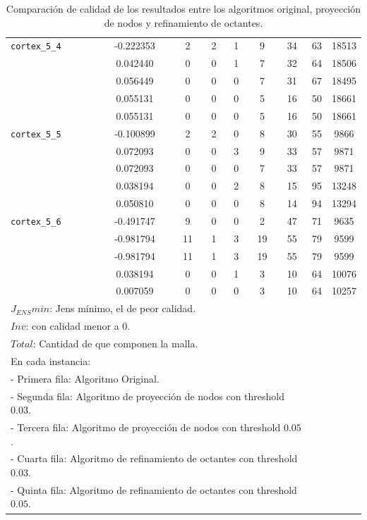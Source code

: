 \begin{table}[H]
\begin{tabular}{lc cc cc cc c}
		\hline
		\texttt{cortex\_5\_4} & -0.222353 & 2 & 2 & 1 & 9 & 34 & 63 & 18513 \\
		& 0.042440 & 0 & 0 & 1 & 7 & 32 & 64 & 18506 \\
		& 0.056449 & 0 & 0 & 0 & 7 & 31 & 67 & 18495 \\
		& 0.055131 & 0 & 0 & 0 & 5 & 16 & 50 & 18661 \\
		& 0.055131 & 0 & 0 & 0 & 5 & 16 & 50 & 18661 \\
		\hline
		\texttt{cortex\_5\_5} & -0.100899 & 2 & 2 & 0 & 8 & 30 & 55 & 9866 \\
		& 0.072093 & 0 & 0 & 3 & 9 & 33 & 57 & 9871 \\
		& 0.072093 & 0 & 0 & 0 & 7 & 33 & 57 & 9871 \\
		& 0.038194 & 0 & 0 & 2 & 8 & 15 & 95 & 13248 \\
		& 0.050810 & 0 & 0 & 0 & 8 & 14 & 94 & 13294 \\
 		\hline
		\texttt{cortex\_5\_6} & -0.491747 & 9 & 0 & 0 & 2 & 47 & 71 & 9635 \\
		& -0.981794 & 11 & 1 & 3 & 19 & 55 & 79 & 9599 \\
		& -0.981794 & 11 & 1 & 3 & 19 & 55 & 79 & 9599 \\
		& 0.038194 & 0 & 0 & 1 & 3 & 10 & 64 & 10076 \\
		& 0.007059 & 0 & 0 & 0 & 3 & 10 & 64 & 10257 \\
		\hline
		\multicolumn{7}{l}{ $J_{ENS}min$: Jens mínimo, el \element{} de peor calidad.} \\
		\multicolumn{7}{l}{ $Inv$: \elements{} con calidad menor a $0$.} \\
		\multicolumn{7}{l}{ $Total$: Cantidad de \elements{} que componen la malla.} \\
		\multicolumn{7}{l}{ En cada instancia: }\\
		\multicolumn{7}{l}{\hspace{1em} - Primera fila: Algoritmo Original.}\\
		\multicolumn{7}{l}{\hspace{1em} - Segunda fila: Algoritmo de proyección de nodos con threshold $0.03$.}\\
		\multicolumn{7}{l}{\hspace{1em} - Tercera fila: Algoritmo de proyección de nodos con threshold $0.05$.}\\
		\multicolumn{7}{l}{\hspace{1em} - Cuarta fila: Algoritmo de refinamiento de octantes con threshold $0.03$.}\\
		\multicolumn{7}{l}{\hspace{1em} - Quinta fila: Algoritmo de refinamiento de octantes con threshold $0.05$.}
	\end{tabular}
	\caption{Comparación de calidad de los resultados entre los algoritmos original, proyección de nodos y refinamiento de octantes. }
	\label{table:cortex_validation}
\end{table}


